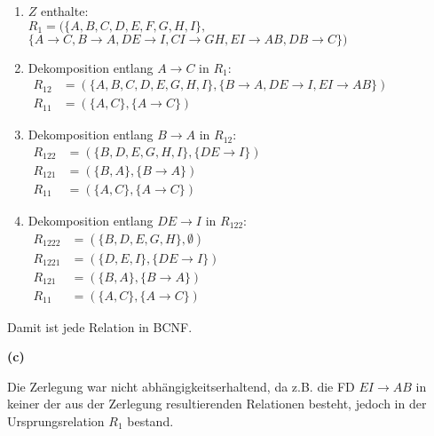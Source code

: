 \documentclass[11pt, a4paper]{article}
\newcommand{\rA}{\rightarrow}
\newcommand{\aufgabenteil}[1] {\textbf{(#1)}}
\begin{document}
\begin{adjustwidth}{20pt}{20pt}

\begin{enumerate}
\item $Z$ enthalte:\\
	$R_1=(\{A, B, C, D, E, F, G, H, I \},$\\
	$\{A \rA C, B \rA A, DE \rA I, CI \rA GH, EI \rA AB, DB \rA C\})$\\

\item Dekomposition entlang $A \rA C$ in $R_1$:\\
	$\begin{aligned}
	R_{12}&=(\{A, B, C, D, E, G, H, I\}, \{B \rA A, DE \rA I, EI \rA AB\})\\
	R_{11}&=(\{A, C\}, \{A \rA C\})
	\end{aligned}$\\
	
\item Dekomposition entlang $B \rA A$ in $R_{12}$:\\
	$\begin{aligned}
	R_{122}&=(\{B, D, E, G, H, I\}, \{DE \rA I\})\\
	R_{121}&=(\{B, A\}, \{B \rA A\})\\
	R_{11}&=(\{A, C\}, \{A \rA C\})
	\end{aligned}$\\
	
\item Dekomposition entlang $DE \rA I$ in $R_{122}$:\\
	$\begin{aligned}
	R_{1222}&=(\{B, D, E, G, H\}, \emptyset)\\
	R_{1221}&=(\{D, E, I\}, \{DE \rA I\})\\
	R_{121}&=(\{B, A\}, \{B \rA A\})\\
	R_{11}&=(\{A, C\}, \{A \rA C\})
	\end{aligned}$\\

\end{enumerate}
Damit ist jede Relation in BCNF.
\end{adjustwidth}
\aufgabenteil{c}
\begin{adjustwidth}{20pt}{20pt}
Die Zerlegung war nicht abhängigkeitserhaltend, da z.B. die FD $EI \rA AB$ in keiner der aus der Zerlegung resultierenden Relationen besteht, jedoch in der Ursprungsrelation $R_1$ bestand.
\end{adjustwidth}



\end{document}

